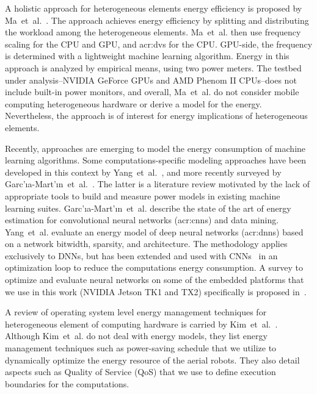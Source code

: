 A holistic approach for heterogeneous elements energy efficiency  is proposed by Ma~et~al.~\citep{ma2012holistic}. The approach achieves energy efficiency by splitting and distributing the workload among the heterogeneous elements. Ma~et~al. then use frequency scaling for the CPU and GPU, and \Gls{acr:dvs} for the CPU. GPU-side, the frequency is determined with a lightweight machine learning algorithm. Energy in this approach is analyzed by empirical means, using two power meters. The testbed under analysis--NVIDIA GeForce GPUs and AMD Phenom II CPUs--does not include built-in power monitors, and overall, Ma~et~al. do not consider mobile computing heterogeneous hardware or derive a model for the energy. Nevertheless, the approach is of interest for energy implications of heterogeneous elements.

Recently, approaches are emerging to model the energy consumption of machine learning algorithms.
Some computations-specific modeling approaches have been developed in this context by Yang~et~al.~\citep{yang2017method}, and more recently surveyed by Garc{'\i}a-Mart{'\i}n~et~al.~\citep{garcia2019estimation}. The latter is a literature review motivated by the lack of appropriate tools to build and measure power models in existing machine learning suites. Garc{'\i}a-Mart{'\i}n~et~al. describe the state of the art of energy estimation for convolutional neural networks (\Gls{acr:cnn}s) and data mining. Yang~et~al. evaluate an energy model of deep neural networks (\Gls{acr:dnn}s) based on a network bitwidth, sparsity, and architecture. The methodology applies exclusively to DNNs, but has been extended and used with CNNs~\citep{yang2017designing} in an optimization loop to reduce the computations energy consumption. A survey to optimize and evaluate neural networks on some of the embedded platforms that we use in this work (NVIDIA Jetson TK1 and TX2) specifically is proposed in~\citep{mittal2019survey}. 

A review of operating system level energy management techniques for heterogeneous element of computing hardware is carried by Kim~et~al.~\citep{kim2018survey}. Although Kim~et~al. do not deal with energy models, they list energy management techniques such as power-saving schedule that we utilize to dynamically optimize the energy resource of the aerial robots. They also detail aspects such as Quality of Service (QoS) that we use to define execution boundaries for the computations. 


